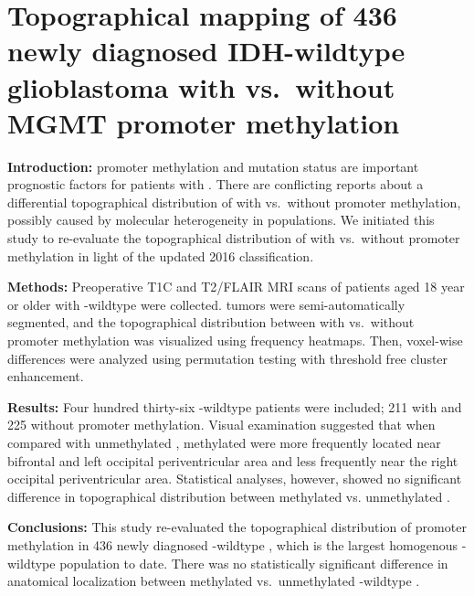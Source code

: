 \chapter[Topographical mapping of 436 newly diagnosed IDH-wildtype glioblastoma with vs.\ without MGMT promoter methylation][Glioblastoma topographical mapping]{Topographical mapping of 436 newly diagnosed IDH-wildtype glioblastoma with vs.\ without MGMT promoter methylation}\label{chap:HGGLocation}


\begin{ChapterAbstract}
    \textbf{Introduction:}  promoter methylation and  mutation status are important prognostic factors for patients with .
    There are conflicting reports about a differential topographical distribution of  with vs.\ without  promoter methylation, possibly caused by molecular heterogeneity in  populations.
    We initiated this study to re-evaluate the topographical distribution of  with vs.\ without  promoter methylation in light of the updated  2016 classification.

    \textbf{Methods:} Preoperative \acrlong{T1C} and \acrlong{T2}/\acrlong{FLAIR} \acrlong{MRI} scans of patients aged 18 year or older with -wildtype  were collected.
    \Glspl{tumor} were semi-automatically segmented, and the topographical distribution between  with vs.\ without  promoter methylation was visualized using frequency heatmaps.
    Then, voxel-wise differences were analyzed using permutation testing with threshold free cluster enhancement.

    \textbf{Results:} Four hundred thirty-six -wildtype  patients were included; 211 with and 225 without  promoter methylation.
    Visual examination suggested that when compared with  unmethylated ,  methylated  were more frequently located near bifrontal and left occipital periventricular area and less frequently near the right occipital periventricular area.
    Statistical analyses, however, showed no significant difference in topographical distribution between  methylated vs.  unmethylated .

    \textbf{Conclusions:} This study re-evaluated the topographical distribution of  promoter methylation in 436 newly diagnosed -wildtype , which is the largest homogenous -wildtype  population to date.
    There was no statistically significant difference in anatomical localization between  methylated vs.\ unmethylated -wildtype .
\end{ChapterAbstract}

